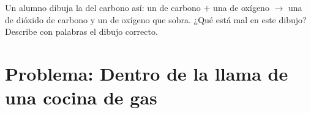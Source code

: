 \begin{exercise}[$\star\star\star$]\label{exo:g7:chemical-reactions:12}
Un alumno dibuja la  del carbono así: un  de carbono $+$
una  de oxígeno $\longrightarrow$ una  de dióxido de
carbono y un  de oxígeno que sobra. ¿Qué está mal en este dibujo?
Describe con palabras el dibujo correcto.
\end{exercise}

\section{Problema: Dentro de la llama de una cocina de gas}

